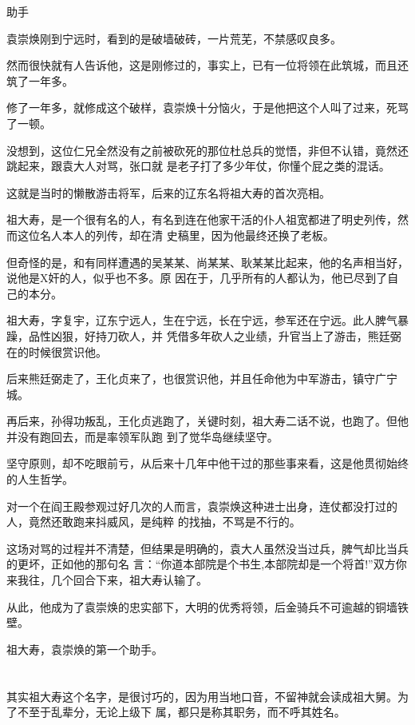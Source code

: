 \documentclass[11pt,a4paper,onecolumn]{article}
\begin{document}
助手

袁崇焕刚到宁远时，看到的是破墙破砖，一片荒芜，不禁感叹良多。

然而很快就有人告诉他，这是刚修过的，事实上，已有一位将领在此筑城，而且还筑了一年多。

修了一年多，就修成这个破样，袁崇焕十分恼火，于是他把这个人叫了过来，死骂了一顿。

没想到，这位仁兄全然没有之前被砍死的那位杜总兵的觉悟，非但不认错，竟然还跳起来，跟袁大人对骂，张口就
是老子打了多少年仗，你懂个屁之类的混话。

这就是当时的懒散游击将军，后来的辽东名将祖大寿的首次亮相。

祖大寿，是一个很有名的人，有名到连在他家干活的仆人祖宽都进了明史列传，然而这位名人本人的列传，却在清
史稿里，因为他最终还换了老板。

但奇怪的是，和有同样遭遇的吴某某、尚某某、耿某某比起来，他的名声相当好，说他是X奸的人，似乎也不多。原
因在于，几乎所有的人都认为，他已尽到了自己的本分。

祖大寿，字复宇，辽东宁远人，生在宁远，长在宁远，参军还在宁远。此人脾气暴躁，品性凶狠，好持刀砍人，并
凭借多年砍人之业绩，升官当上了游击，熊廷弼在的时候很赏识他。

后来熊廷弼走了，王化贞来了，也很赏识他，并且任命他为中军游击，镇守广宁城。

再后来，孙得功叛乱，王化贞逃跑了，关键时刻，祖大寿二话不说，也跑了。但他并没有跑回去，而是率领军队跑
到了觉华岛继续坚守。

坚守原则，却不吃眼前亏，从后来十几年中他干过的那些事来看，这是他贯彻始终的人生哲学。

对一个在阎王殿参观过好几次的人而言，袁崇焕这种进士出身，连仗都没打过的人，竟然还敢跑来抖威风，是纯粹
的找抽，不骂是不行的。

这场对骂的过程并不清楚，但结果是明确的，袁大人虽然没当过兵，脾气却比当兵的更坏，正如他的那句名
言：``你道本部院是个书生,本部院却是一个将首!''双方你来我往，几个回合下来，祖大寿认输了。

从此，他成为了袁崇焕的忠实部下，大明的优秀将领，后金骑兵不可逾越的铜墙铁壁。

祖大寿，袁崇焕的第一个助手。

\section[\thesection]{}

其实祖大寿这个名字，是很讨巧的，因为用当地口音，不留神就会读成祖大舅。为了不至于乱辈分，无论上级下
属，都只是称其职务，而不呼其姓名。
\end{document}
